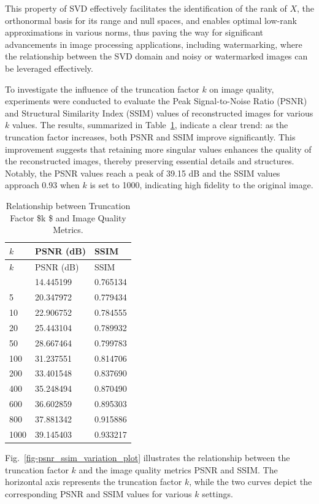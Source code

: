 \documentclass[
  journal,
]{IEEEtran}%
\begin{document}
This property of SVD effectively facilitates the identification of the
rank of \(X\), the orthonormal basis for its range and null spaces, and
enables optimal low-rank approximations in various norms, thus paving
the way for significant advancements in image processing applications,
including watermarking, where the relationship between the SVD domain
and noisy or watermarked images can be leveraged effectively.

To investigate the influence of the truncation factor \(k\) on image
quality, experiments were conducted to evaluate the Peak Signal-to-Noise
Ratio (PSNR) and Structural Similarity Index (SSIM) values of
reconstructed images for various \(k\) values. The results, summarized
in Table~\ref{tbl-truncation_vs_quality}, indicate a clear trend: as the
truncation factor increases, both PSNR and SSIM improve significantly.
This improvement suggests that retaining more singular values enhances
the quality of the reconstructed images, thereby preserving essential
details and structures. Notably, the PSNR values reach a peak of 39.15
dB and the SSIM values approach 0.93 when \(k\) is set to 1000,
indicating high fidelity to the original image.

\begin{longtable}[]{@{}lll@{}}
\caption{Relationship between Truncation Factor \$k \$ and Image Quality
Metrics.}\label{tbl-truncation_vs_quality}\tabularnewline
\toprule\noalign{}
\(k\) & PSNR (dB) & SSIM \\
\midrule\noalign{}
\endfirsthead
\toprule\noalign{}
\(k\) & PSNR (dB) & SSIM \\
\midrule\noalign{}
\endhead
\bottomrule\noalign{}
\endlastfoot
1 & 14.445199 & 0.765134 \\
5 & 20.347972 & 0.779434 \\
10 & 22.906752 & 0.784555 \\
20 & 25.443104 & 0.789932 \\
50 & 28.667464 & 0.799783 \\
100 & 31.237551 & 0.814706 \\
200 & 33.401548 & 0.837690 \\
400 & 35.248494 & 0.870490 \\
600 & 36.602859 & 0.895303 \\
800 & 37.881342 & 0.915886 \\
1000 & 39.145403 & 0.933217 \\
\end{longtable}

Fig.~\ref{fig-psnr_ssim_variation_plot} illustrates the relationship
between the truncation factor \(k\) and the image quality metrics PSNR
and SSIM. The horizontal axis represents the truncation factor \(k\),
while the two curves depict the corresponding PSNR and SSIM values for
various \(k\) settings.
\end{document}
